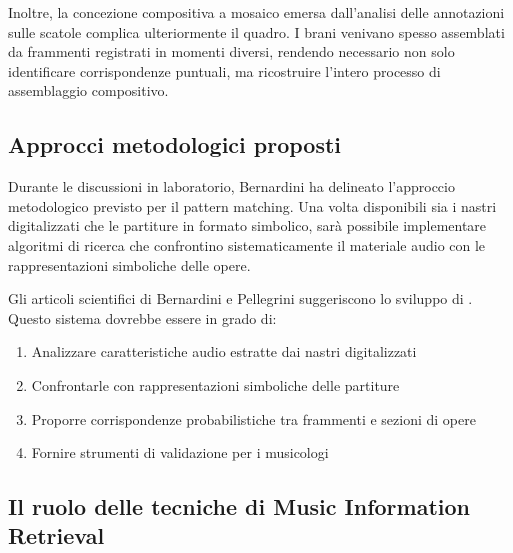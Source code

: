 Inoltre, la concezione compositiva a mosaico emersa dall'analisi delle annotazioni sulle scatole complica ulteriormente il quadro. I brani venivano spesso assemblati da frammenti registrati in momenti diversi, rendendo necessario non solo identificare corrispondenze puntuali, ma ricostruire l'intero processo di assemblaggio compositivo.

\subsection{Approcci metodologici proposti}

Durante le discussioni in laboratorio, Bernardini ha delineato l'approccio metodologico previsto per il pattern matching. Una volta disponibili sia i nastri digitalizzati che le partiture in formato simbolico, sarà possibile implementare algoritmi di ricerca che confrontino sistematicamente il materiale audio con le rappresentazioni simboliche delle opere.

Gli articoli scientifici di Bernardini e Pellegrini suggeriscono lo sviluppo di . Questo sistema dovrebbe essere in grado di:

\begin{enumerate}
 \item Analizzare caratteristiche audio estratte dai nastri digitalizzati
 \item Confrontarle con rappresentazioni simboliche delle partiture
 \item Proporre corrispondenze probabilistiche tra frammenti e sezioni di opere
 \item Fornire strumenti di validazione per i musicologi
\end{enumerate}

\subsection{Il ruolo delle tecniche di Music Information Retrieval}

